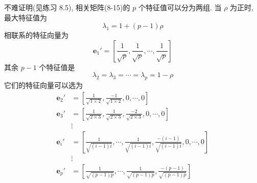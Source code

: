 不难证明(见练习 8.5), 相关矩阵(8-15)的 $p$ 个特征值可以分为两组. 当 $\rho$ 为正时, 最大特征值为
\label{eq:8-16}
\begin{equation}
\lambda_1=1+(p-1)\rho
\tag{8-16}
\end{equation}
相联系的特征向量为
\label{eq:8-17}
\begin{equation}
\mathbf{e}_1'=\left[\frac{1}{\sqrt{p}},\frac{1}{\sqrt{p}},\cdots,\frac{1}{\sqrt{p}}\right]
\tag{8-17}
\end{equation}
其余 $p-1$ 个特征值是
\[
\lambda_2=\lambda_3=\cdots=\lambda_p=1-\rho
\]
它们的特征向量可以选为
\[
\begin{aligned}
\mathbf{e}_2'&=\left[\frac{1}{\sqrt{1\times2}},\frac{-1}{\sqrt{1\times2}},0,\cdots,0\right]\\
\mathbf{e}_3'&=\left[\frac{1}{\sqrt{2\times3}},\frac{1}{\sqrt{2\times3}},\frac{-2}{\sqrt{2\times3}},0,\cdots,0\right]\\
&\vdots\\
\mathbf{e}_i'&=\left[\frac{1}{\sqrt{(i-1)i}},\cdots,\frac{1}{\sqrt{(i-1)i}},\frac{-(i-1)}{\sqrt{(i-1)i}},0,\cdots,0\right]\\
&\vdots\\
\mathbf{e}_p'&=\left[\frac{1}{\sqrt{(p-1)p}},\cdots,\frac{1}{\sqrt{(p-1)p}},\frac{-(p-1)}{\sqrt{(p-1)p}}\right]
\end{aligned}
\]
